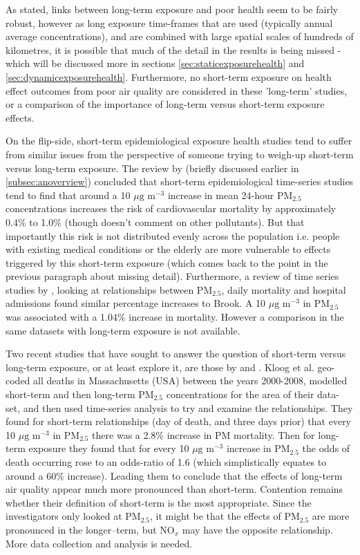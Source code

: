 As stated, links between long-term exposure and poor health seem to be fairly robust, however as long exposure time-frames that are used (typically annual average concentrations), and are combined with large spatial scales of hundreds of kilometres, it is possible that much of the detail in the results is being missed - which will be discussed more in sections \ref{sec:staticexposurehealth} and \ref{sec:dynamicexposurehealth}. Furthermore, no short-term exposure on health effect outcomes from poor air quality are considered in these 'long-term' studies, or a comparison of the importance of long-term versus short-term exposure effects.

On the flip-side, short-term epidemiological exposure health studies tend to suffer from similar issues from the perspective of someone trying to weigh-up short-term versus long-term exposure. The review by \cite{Brook2010} (briefly discussed earlier in \ref{subsec:anoverview}) concluded that short-term epidemiological time-series studies tend to find that around a 10 $\mu \text{g m}^{-3}$ increase in mean 24-hour PM$_{2.5}$ concentrations increases the risk of cardiovascular mortality by approximately 0.4\% to 1.0\% (though doesn't comment on other pollutants). But that importantly this risk is not distributed evenly across the population i.e. people with existing medical conditions or the elderly are more vulnerable to effects triggered by this short-term exposure (which comes back to the point in the previous paragraph about missing detail). Furthermore, a review of time series studies by \cite{Atkinson2014}, looking at relationships between PM$_{2.5}$, daily mortality and hospital admissions found similar percentage increases to Brook. A 10 $\mu \text{g m}^{-3}$ in PM$_{2.5}$ was associated with a 1.04\% increase in mortality. However a comparison in the same datasets with long-term exposure is not available.

Two recent studies that have sought to answer the question of short-term versus long-term exposure, or at least explore it, are those by \cite{Kloog2013} and \cite{Beverland2012a}. Kloog et al. geo-coded all deaths in Massachusetts (USA) between the years 2000-2008, modelled short-term and then long-term PM$_{2.5}$ concentrations for the area of their data-set, and then used time-series analysis to try and examine the relationships. They found for short-term relationships (day of death, and three days prior) that every 10 $\mu \text{g m}^{-3}$ in PM$_{2.5}$ there was a 2.8\% increase in PM mortality. Then for long-term exposure they found that for every 10 $\mu \text{g m}^{-3}$ increase in PM$_{2.5}$ the odds of death occurring rose to an odds-ratio of 1.6 (which simplistically equates to around a 60\% increase). Leading them to conclude that the effects of long-term air quality appear much more pronounced than short-term. Contention remains whether their definition of short-term is the most appropriate. Since the investigators only looked at PM$_{2.5}$, it might be that the effects of PM$_{2.5}$ are more pronounced in the longer--term, but NO$_{x}$ may have the opposite relationship. More data collection and analysis is needed.

